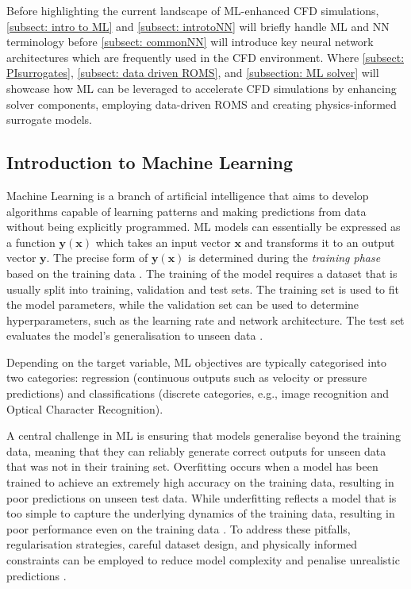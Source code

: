 Before highlighting the current landscape of ML-enhanced CFD simulations, \autoref{subsect: intro to ML} and \autoref{subsect: introtoNN} will briefly handle ML and NN terminology before \autoref{subsect: commonNN} will introduce key neural network architectures which are frequently used in the CFD environment. Where \autoref{subsect: PIsurrogates}, \autoref{subsect: data driven ROMS}, and \ref{subsection: ML solver} will showcase how ML can be leveraged to accelerate CFD simulations by enhancing solver components, employing data-driven ROMS and creating physics-informed surrogate models. 


\subsection{Introduction to Machine Learning}
\label{subsect: intro to ML}
Machine Learning is a branch of artificial intelligence that aims to develop algorithms capable of learning patterns and making predictions from data without being explicitly programmed. ML models can essentially be expressed as a function $\boldsymbol{y}(\boldsymbol{x})$ which takes an input vector $\boldsymbol{x}$ and transforms it to an output vector $\boldsymbol{y}$. The precise form of $\boldsymbol{y}(\boldsymbol{x})$ is determined during the \textit{training phase} based on the training data \cite{bishop2007}. The training of the model requires a dataset that is usually split into training, validation and test sets. The training set is used to fit the model parameters, while the validation set can be used to determine hyperparameters, such as the learning rate and network architecture. The test set evaluates the model's generalisation to unseen data \cite{burkov2020}. 

Depending on the target variable, ML objectives are typically categorised into two categories: regression (continuous outputs such as velocity or pressure predictions) and classifications (discrete categories, e.g., image recognition and Optical Character Recognition).

A central challenge in ML is ensuring that models generalise beyond the training data, meaning that they can reliably generate correct outputs for unseen data that was not in their training set. Overfitting occurs when a model has been trained to achieve an extremely high accuracy on the training data, resulting in poor predictions on unseen test data. While underfitting reflects a model that is too simple to capture the underlying dynamics of the training data, resulting in poor performance even on the training data \cite{burkov2020}. To address these pitfalls, regularisation strategies, careful dataset design, and physically informed constraints can be employed to reduce model complexity and penalise unrealistic predictions \cite{Aggarwal2018, sanderse2024}.

